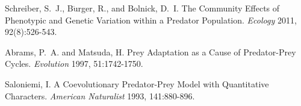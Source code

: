 \documentclass{amsart}
\theoremstyle{definition}
\theoremstyle{remark}
\numberwithin{equation}{section}
\begin{document}









\pagebreak

\begin{thebibliography}{10}

Schreiber, S.~J., B$\ddot{\mbox{u}}$rger,  R., and Bolnick,  D.~I.
The Community Effects of Phenotypic and Genetic Variation within a Predator Population.
\emph{Ecology}
2011,  92(8):526-543. 



Abrams, P.~A. and Matsuda, H.
Prey Adaptation as a Cause of Predator-Prey Cycles.
\emph{Evolution}
1997, 51:1742-1750.


Saloniemi, I.
A Coevolutionary Predator-Prey Model with Quantitative Characters.
\emph{American Naturalist}
1993, 141:880-896.


\end{thebibliography}
\end{document}
